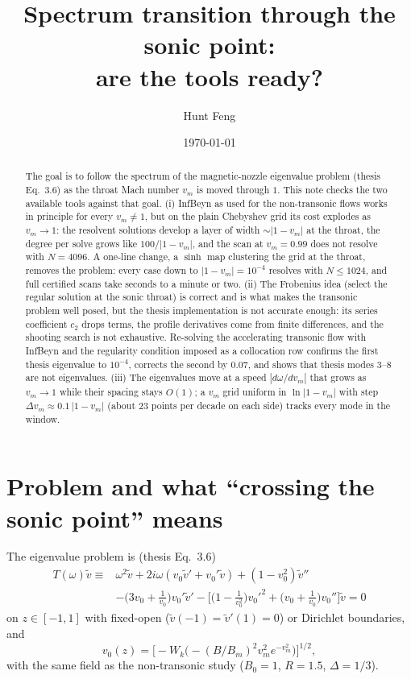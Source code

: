 \documentclass[11pt]{article}
\title{Spectrum transition through the sonic point:\\
are the tools ready?}
\author{Hunt Feng}
\date{\today}
\newcommand{\infbeyn}{InfBeyn}
\begin{document}
\maketitle

\begin{abstract}
The goal is to follow the spectrum of the magnetic-nozzle eigenvalue problem (thesis Eq.~3.6) as the throat
Mach number $v_m$ is moved through $1$. This note checks the two available tools against that goal.
(i) \infbeyn{} as used for the non-transonic flows works in principle for every $v_m\neq1$, but on the plain
Chebyshev grid its cost explodes as $v_m\to1$: the resolvent solutions develop a layer of width
$\sim|1-v_m|$ at the throat, the degree per solve grows like $100/|1-v_m|$, and the scan at $v_m=0.99$ does
not resolve with $N=4096$. A one-line change, a $\sinh$ map clustering the grid at the throat, removes the
problem: every case down to $|1-v_m|=10^{-4}$ resolves with $N\le1024$, and full certified scans take
seconds to a minute or two. (ii) The Frobenius idea (select the regular solution at the sonic throat) is
correct and is what makes the transonic problem well posed, but the thesis implementation is not accurate
enough: its series coefficient $c_2$ drops terms, the profile derivatives come from finite differences,
and the shooting search is not exhaustive. Re-solving the accelerating transonic flow with \infbeyn{} and the
regularity condition imposed as a collocation row confirms the first thesis eigenvalue to $10^{-4}$, corrects
the second by $0.07$, and shows that thesis modes 3--8 are not eigenvalues. (iii) The eigenvalues move at a
speed $|d\omega/dv_m|$ that grows as $v_m\to1$ while their spacing stays $O(1)$; a $v_m$ grid uniform in
$\ln|1-v_m|$ with step $\Delta v_m\approx0.1\,|1-v_m|$ (about 23 points per decade on each side) tracks
every mode in the window.
\end{abstract}

\section{Problem and what ``crossing the sonic point'' means}

The eigenvalue problem is (thesis Eq.~3.6)
\begin{equation}
  \begin{split}
  T(\omega)\tilde v \equiv{}&
  \omega^2 \tilde v + 2i\omega\left(v_0\tilde v' + v_0'\tilde v\right)
  + (1-v_0^2)\tilde v'' \\
  &- \Big(3v_0+\frac1{v_0}\Big)v_0'\tilde v'
  - \Big[\Big(1-\frac1{v_0^2}\Big)v_0'^2 + \Big(v_0+\frac1{v_0}\Big)v_0''\Big]\tilde v = 0
  \end{split}
  \label{eq:nep}
\end{equation}
on $z\in[-1,1]$ with fixed-open ($\tilde v(-1)=\tilde v'(1)=0$) or Dirichlet boundaries, and
\[
  v_0(z)=\big[-W_k\big(-(B/B_m)^2v_m^2e^{-v_m^2}\big)\big]^{1/2},
\]
with the same field as the non-transonic study ($B_0=1$, $R=1.5$, $\Delta=1/3$).
\end{document}
